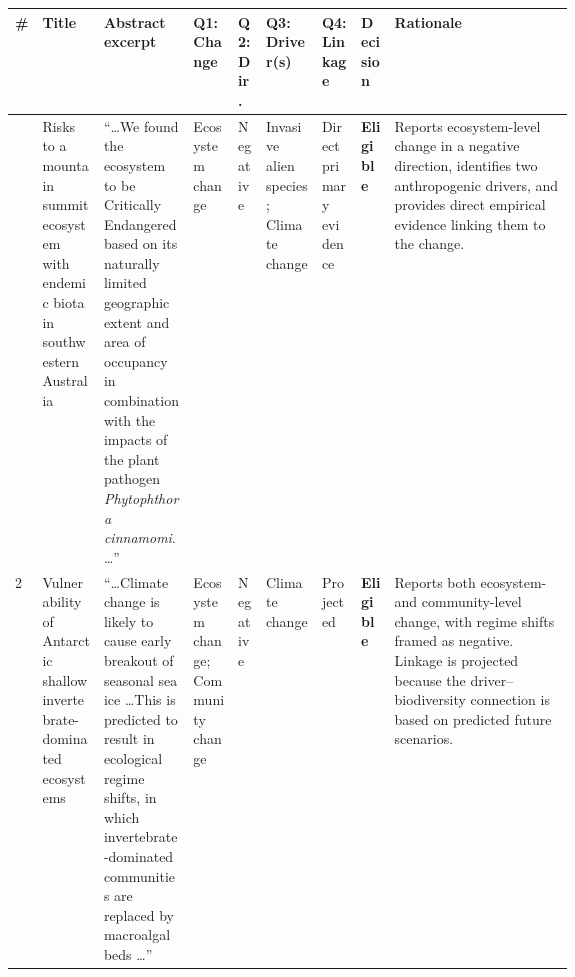 \documentclass[12pt]{article}
\renewcommand{\arraystretch}{1.2}
\begin{document}
\thispagestyle{plain}
\begin{landscape}
\begin{table}[p]
\renewcommand{\arraystretch}{1.0}
\setlength{\tabcolsep}{3pt}
\centering
\singlespacing 
\scriptsize
\begin{tabularx}{\linewidth}{|>{\raggedright\arraybackslash}p{0.02\linewidth}
                             |>{\raggedright\arraybackslash}p{0.11\linewidth}
                             |>{\raggedright\arraybackslash}p{0.16\linewidth}
                             |>{\raggedright\arraybackslash}p{0.08\linewidth}
                             |>{\raggedright\arraybackslash}p{0.05\linewidth}
                             |>{\raggedright\arraybackslash}p{0.10\linewidth}
                             |>{\raggedright\arraybackslash}p{0.07\linewidth}
                             |>{\raggedright\arraybackslash}p{0.06\linewidth}
                             |>{\raggedright\arraybackslash}X|}
\hline
\textbf{\#} &
\textbf{Title} &
\textbf{Abstract excerpt} &
\textbf{Q1: Change} &
\textbf{Q2: Dir.} &
\textbf{Q3: Driver(s)} &
\textbf{Q4: Linkage} &
\textbf{Decision} &
\textbf{Rationale} \\
\hline

1 &
Risks to a mountain summit ecosystem with endemic biota in southwestern Australia &
``\ldots We found the ecosystem to be Critically Endangered based on its naturally limited geographic extent and area of occupancy in combination with the impacts of the plant pathogen \textit{Phytophthora cinnamomi}. \ldots'' &
Ecosystem change &
Negative &
Invasive alien species; Climate change &
Direct primary evidence &
\textbf{Eligible} &
Reports ecosystem-level change in a negative direction, identifies two anthropogenic drivers, and provides direct empirical evidence linking them to the change. \\
\hline

2 &
Vulnerability of Antarctic shallow invertebrate-dominated ecosystems &
``\ldots Climate change is likely to cause early breakout of seasonal sea ice \ldots This is predicted to result in ecological regime shifts, in which invertebrate-dominated communities are replaced by macroalgal beds \ldots'' &
Ecosystem change; Community change &
Negative &
Climate change &
Projected &
\textbf{Eligible} &
Reports both ecosystem- and community-level change, with regime shifts framed as negative. Linkage is projected because the driver--biodiversity connection is based on predicted future scenarios. \\
\hline


\end{tabularx}
\end{table}
\end{landscape}
\end{document}
